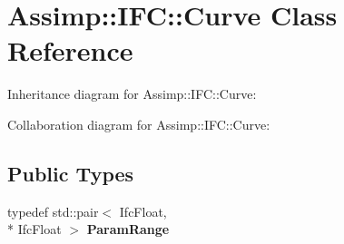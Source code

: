 \hypertarget{class_assimp_1_1_i_f_c_1_1_curve}{\section{Assimp\+:\+:I\+F\+C\+:\+:Curve Class Reference}
\label{class_assimp_1_1_i_f_c_1_1_curve}
}


Inheritance diagram for Assimp\+:\+:I\+F\+C\+:\+:Curve\+:


Collaboration diagram for Assimp\+:\+:I\+F\+C\+:\+:Curve\+:
\subsection*{Public Types}
\begin{DoxyCompactItemize}
\item 
\hypertarget{class_assimp_1_1_i_f_c_1_1_curve_aaae9a249537cf6f8061ae85419848284}{typedef std\+::pair$<$ Ifc\+Float, \\*
Ifc\+Float $>$ {\bfseries Param\+Range}}\label{class_assimp_1_1_i_f_c_1_1_curve_aaae9a249537cf6f8061ae85419848284}

\end{DoxyCompactItemize}
